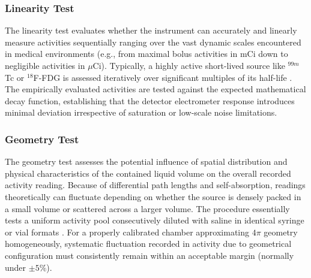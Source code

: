 \subsubsection{Linearity Test}
The linearity test evaluates whether the instrument can accurately and linearly measure activities sequentially ranging over the vast dynamic scales encountered in medical environments (e.g., from maximal bolus activities in mCi down to negligible activities in $\mu$Ci). Typically, a highly active short-lived source like $^{99m}$Tc or $^{18}$F-FDG is assessed iteratively over significant multiples of its half-life \cite{cherry2012physics}. The empirically evaluated activities are tested against the expected mathematical decay function, establishing that the detector electrometer response introduces minimal deviation irrespective of saturation or low-scale noise limitations.

\subsubsection{Geometry Test}
The geometry test assesses the potential influence of spatial distribution and physical characteristics of the contained liquid volume on the overall recorded activity reading. Because of differential path lengths and self-absorption, readings theoretically can fluctuate depending on whether the source is densely packed in a small volume or scattered across a larger volume. The procedure essentially tests a uniform activity pool consecutively diluted with saline in identical syringe or vial formats \cite{aapm181}. For a properly calibrated chamber approximating $4\pi$ geometry homogeneously, systematic fluctuation recorded in activity due to geometrical configuration must consistently remain within an acceptable margin (normally under $\pm 5\%$).
